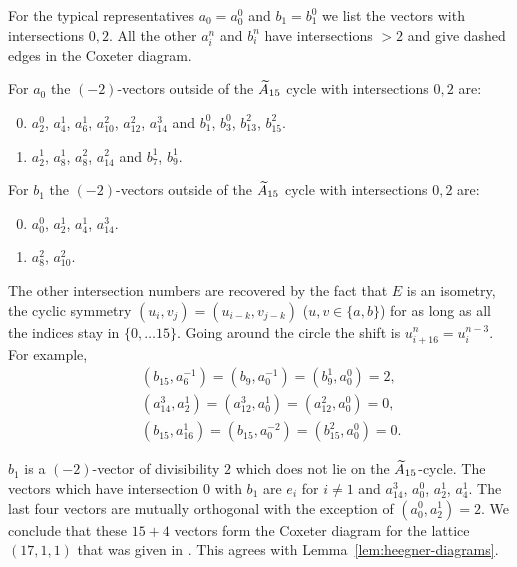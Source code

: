 \documentclass{amsart}
\begin{document}
For the typical representatives $a_0=a_0^{0}$ and $b_1=b_1^{0}$ we list
the vectors with intersections $0,2$. All the other $a_i^{n}$ and
$b_i^{n}$ have intersections $>2$ and give dashed edges in the
Coxeter diagram. 

For $a_0$ the $(-2)$-vectors outside of the ${\widetilde A}_{15}$ cycle with
intersections $0,2$ are: 

\begin{enumerate}
  \setcounter{enumi}{-1}
\item $a_2^{0}$, $a_4^{1}$, $a_6^{1}$, $a_{10}^{2}$,  $a_{12}^{2}$, $a_{14}^{3}$
  and $b_1^{0}$, $b_3^{0}$, $b_{13}^{2}$, $b_{15}^{2}$. 
  \setcounter{enumi}{1}
\item $a_2^{1}$, $a_8^{1}$, $a_8^{2}$, $a_{14}^{2}$ and 
  $b_7^{1}$, $b_9^{1}$.  
\end{enumerate}

For $b_1$ the $(-2)$-vectors outside of the ${\widetilde A}_{15}$ cycle with
intersections $0,2$ are: 

\begin{enumerate}
  \setcounter{enumi}{-1}
\item $a_0^0$, $a_2^1$, $a_4^1$, $a_{14}^3$.
  \setcounter{enumi}{1}
\item $a_8^2$, $a_{10}^2$.
\end{enumerate}

The other intersection numbers are recovered by the fact that $E$ is
an isometry, the cyclic symmetry $(u_i, v_j) = (u_{i-k}, v_{j-k})$
($u,v\in \{a,b\}$) for as long as all the indices stay in
$\{0,\dotsc 15\}$. Going around the circle the shift is
$u_{i+16}^n = u_i^{n-3}$. For example,
\begin{eqnarray*}
  && (b_{15}, a_{6}^{-1}) = (b_9, a_0^{-1}) = (b_9^1, a_0^0) = 2,\\
  && (a_{14}^3, a_2^1) = (a_{12}^3, a_0^1) = (a_{12}^2, a_0^0)= 0, \\
  && (b_{15}, a_{16}^1) = (b_{15}, a_0^{-2}) = (b_{15}^2, a_0^0) = 0.     
\end{eqnarray*}

\begin{example}
  $b_1$ is a $(-2)$-vector of divisibility $2$ which does not lie on
  the ${\widetilde A}_{15}$-cycle. 
  The vectors which have intersection $0$ with $b_1$ are $e_i$ for
  $i\ne1$ and $a_{14}^3$, $a_0^0$, $a_2^1$, $a_4^1$. The last four
  vectors are mutually orthogonal with the exception of
  $(a_0^0, a_2^1)=2$. We conclude that these $15+4$ vectors form the
  Coxeter diagram for the lattice $(17,1,1)$ that was given in
  \cite[Table~1]{alexeev2006del-pezzo}.
  This agrees with Lemma~\ref{lem:heegner-diagrams}.
\end{example}
\end{document}
